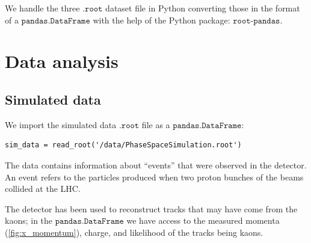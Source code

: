We handle the three $\texttt{.root}$ dataset file in Python converting those in the format of a $\texttt{pandas.DataFrame}$ with the help of the Python package:
\href{https://pypi.org/project/root-pandas/}{$\texttt{root-pandas}$}.
\section{Data analysis}

\subsection{Simulated data}\label{sec:sim_data}

We import the simulated data $\texttt{.root}$ file as a $\texttt{pandas.DataFrame}$:

\begin{lstlisting}
sim_data = read_root('/data/PhaseSpaceSimulation.root')
\end{lstlisting}

The data contains information about \enquote{events} that were observed in the detector. An event refers to the particles produced when two proton bunches of the beams collided at the LHC.

The detector has been used to reconstruct tracks that may have
come from the kaons; in the $\texttt{pandas.DataFrame}$ we have access to the measured momenta (\autoref{fig:x_momentum}), charge, and likelihood of the tracks being kaons.

\begin{figure}[H]
	\centering
	\caption{} %
	\label{fig:x_momentum}
\end{figure}

